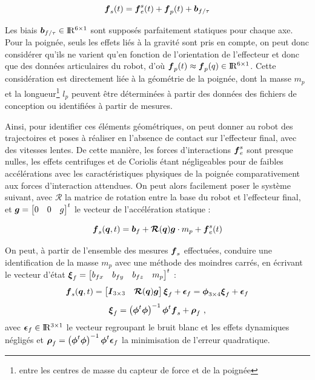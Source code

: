 \begin{appendices}
	\begin{equation}
		\vect{f}_s(t) = \vect{f}_e^s(t) + \vect{f}_p(t) + \vect{b}_{f/\tau}
	\end{equation}
	
	Les biais $\vect{b}_{f/\tau} \in \Re^{6\times1}$ sont supposés parfaitement statiques pour chaque axe. Pour la poignée, seuls les effets liés à la gravité sont pris en compte, on peut donc considérer qu'ils ne varient qu'en fonction de l'orientation de l'effecteur et donc que des données articulaires du robot, d'où $\vect{f}_p(t) \approx \vect{f}_p(q) \in \Re^{6\times1}$. Cette considération est directement liée à la géométrie de la poignée, dont la masse $m_p$ et la longueur\footnote{entre les centres de masse du capteur de force et de la poignée} $l_p$ peuvent être déterminées à partir des données des fichiers de conception ou identifiées à partir de mesures.
	
	Ainsi, pour identifier ces éléments géométriques, on peut donner au robot des trajectoires et poses à réaliser en l'absence de contact sur l'effecteur final, avec des vitesses lentes. De cette manière, les forces d'interactions $\vect{f}_e^s$ sont presque nulles, les effets centrifuges et de Coriolis étant négligeables pour de faibles accélérations avec les caractéristiques physiques de la poignée comparativement aux forces d'interaction attendues. On peut alors facilement poser le système suivant, avec $\boldsymbol{\mathcal{R}}$ la matrice de rotation entre la base du robot et l'effecteur final, et $\vect{g} = \begin{bmatrix} 0 & 0 & g\end{bmatrix}^t$ le vecteur de l'accélération statique :
	
	\begin{equation}
		\vect{f}_s(\vect{q}, t) = \vect{b}_f + \boldsymbol{\mathcal{R}}(\vect{q}) \vect{g} \cdot m_p + \vect{f}_e^s(t)
	\end{equation}
	
	On peut, à partir de l'ensemble des mesures $\vect{f}_s$ effectuées, conduire une identification de la masse $m_p$ avec une méthode des moindres carrés, en écrivant le vecteur d'état $\vect{\xi}_f = \begin{bmatrix} b_{fx} & b_{fy} & b_{fz} & m_p \end{bmatrix}^t$ :
	\begin{equation}
		\vect{f}_s(\vect{q}, t) = \begin{bmatrix}\matr{I}_{3\times3} & \boldsymbol{\mathcal{R}}(\vect{q})\vect{g} \end{bmatrix} \vect{\xi}_f + \vect{\epsilon}_f = \matr{\phi}_{3\times4} \vect{\xi}_f + \vect{\epsilon}_f
	\end{equation}
	\begin{equation}
		\vect{\xi}_f = \left(\matr{\phi}^t\matr{\phi}\right)^{-1} \matr{\phi}^t \vect{f}_s + \vect{\rho}_f \text{ ,}
	\end{equation}
	avec $\vect{\epsilon}_f \in \Re^{3\times1}$ le vecteur regroupant le bruit blanc et les effets dynamiques négligés et $\vect{\rho}_f = \left(\matr{\phi}^t\matr{\phi}\right)^{-1} \matr{\phi}^t \vect{\epsilon}_f$ la minimisation de l'erreur quadratique.
	

\end{appendices}
